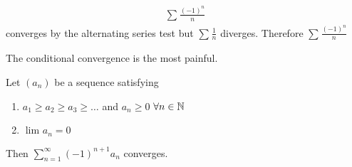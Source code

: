 \begin{eg}
	\begin{align}
		\sum_{}^{} \frac{\left( -1 \right)^{n}}{n}
	\end{align}
	converges by the alternating series test but $\sum_{}^{} \frac{1}{n}$ diverges. Therefore $\sum_{}^{} \frac{\left( -1 \right)^{n}}{n}$
\end{eg}

\begin{note}
	The conditional convergence is the most painful.
\end{note}

\begin{theorem}
	Let $\left( a_n \right) $ be a sequence satisfying
	\begin{enumerate}
		\item $a_1 \ge a_2 \ge a_3 \ge \ldots$ and $a_n \ge 0$ $\forall n \in \mathbb{N}$
		\item $\lim_{} a_n = 0$
	\end{enumerate}
	Then $\sum_{n=1}^{\infty} \left( -1 \right)^{n+1} a_n$ converges.
\end{theorem}


